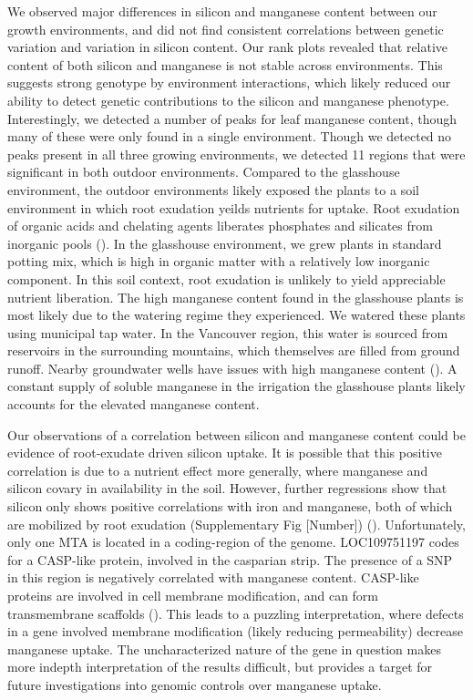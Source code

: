 \documentclass[12pt, letterpaper, ]{report}
\begin{document}
We observed major differences in silicon and manganese content between our growth environments, and did not find consistent correlations between genetic variation and variation in silicon content. Our rank plots revealed that relative content of both silicon and manganese is not stable across environments. This suggests strong genotype by environment interactions, which likely reduced our ability to detect genetic contributions to the silicon and manganese phenotype. Interestingly, we detected a number of peaks for leaf manganese content, though many of these were only found in a single environment. Though we detected no peaks present in all three growing environments, we detected 11 regions that were significant in both outdoor environments. Compared to the glasshouse environment, the outdoor environments likely exposed the plants to a soil environment in which root exudation yeilds nutrients for uptake. Root exudation of organic acids and chelating agents liberates phosphates and silicates from inorganic pools (\cite{de_tombeur_silicon_2021-1,lambers_plant_2008}). In the glasshouse environment, we grew plants in standard potting mix, which is high in organic matter with a relatively low inorganic component. In this soil context, root exudation is unlikely to yield appreciable nutrient liberation. The high manganese content found in the glasshouse plants is most likely due to the watering regime they experienced. We watered these plants using municipal tap water. In the Vancouver region, this water is sourced from reservoirs in the surrounding mountains, which themselves are filled from ground runoff. Nearby groundwater wells have issues with high manganese content (\cite{hu_drinking_2020}). A constant supply of soluble manganese in the irrigation the glasshouse plants likely accounts for the elevated manganese content. 

Our observations of a correlation between silicon and manganese content could be evidence of root-exudate driven silicon uptake. It is possible that this positive correlation is due to a nutrient effect more generally, where manganese and silicon covary in availability in the soil. However, further regressions show that silicon only shows positive correlations with iron and manganese, both of which are mobilized by root exudation (Supplementary Fig [Number]) (\cite{de_tombeur_silicon_2021-1}). Unfortunately, only one MTA is located in a coding-region of the genome. LOC109751197 codes for a CASP-like protein, involved in the casparian strip. The presence of a SNP in this region is negatively correlated with manganese content. CASP-like proteins are involved in cell membrane modification, and can form transmembrane scaffolds (\cite{roppolo_functional_2014}). This leads to a puzzling interpretation, where defects in a gene involved membrane modification (likely reducing permeability) decrease manganese uptake.  The uncharacterized nature of the gene in question makes more indepth interpretation of the results difficult, but provides a target for future investigations into genomic controls over manganese uptake.
\end{document}
